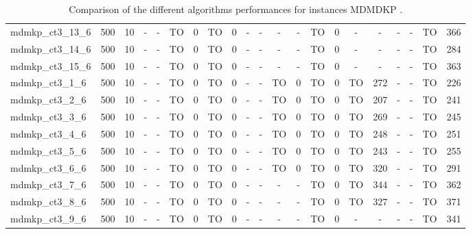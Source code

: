 \begin{sidewaystable}[!ht]
{\begin{tabular}{lcccccccccccccccccccc}
mdmkp\_ct3\_13\_6 & 500 & 10 &  - &  - & TO & 0 & TO & 0 &  - &  - &  - &  - & TO & 0 &  - &  - &  - &  - & TO & 366 \\
mdmkp\_ct3\_14\_6 & 500 & 10 &  - &  - & TO & 0 & TO & 0 &  - &  - &  - &  - & TO & 0 &  - &  - &  - &  - & TO & 284 \\
mdmkp\_ct3\_15\_6 & 500 & 10 &  - &  - & TO & 0 & TO & 0 &  - &  - &  - &  - & TO & 0 &  - &  - &  - &  - & TO & 363 \\
mdmkp\_ct3\_1\_6 & 500 & 10 &  - &  - & TO & 0 & TO & 0 &  - &  - & TO & 0 & TO & 0 & TO & 272 &  - &  - & TO & 226 \\
mdmkp\_ct3\_2\_6 & 500 & 10 &  - &  - & TO & 0 & TO & 0 &  - &  - & TO & 0 & TO & 0 & TO & 207 &  - &  - & TO & 241 \\
mdmkp\_ct3\_3\_6 & 500 & 10 &  - &  - & TO & 0 & TO & 0 &  - &  - & TO & 0 & TO & 0 & TO & 269 &  - &  - & TO & 245 \\
mdmkp\_ct3\_4\_6 & 500 & 10 &  - &  - & TO & 0 & TO & 0 &  - &  - & TO & 0 & TO & 0 & TO & 248 &  - &  - & TO & 251 \\
mdmkp\_ct3\_5\_6 & 500 & 10 &  - &  - & TO & 0 & TO & 0 &  - &  - & TO & 0 & TO & 0 & TO & 243 &  - &  - & TO & 255 \\
mdmkp\_ct3\_6\_6 & 500 & 10 &  - &  - & TO & 0 & TO & 0 &  - &  - & TO & 0 & TO & 0 & TO & 320 &  - &  - & TO & 291 \\
mdmkp\_ct3\_7\_6 & 500 & 10 &  - &  - & TO & 0 & TO & 0 &  - &  - &  - &  - & TO & 0 & TO & 344 &  - &  - & TO & 362 \\
mdmkp\_ct3\_8\_6 & 500 & 10 &  - &  - & TO & 0 & TO & 0 &  - &  - &  - &  - & TO & 0 & TO & 327 &  - &  - & TO & 371 \\
mdmkp\_ct3\_9\_6 & 500 & 10 &  - &  - & TO & 0 & TO & 0 &  - &  - &  - &  - & TO & 0 &  - &  - &  - &  - & TO & 341 \\
\bottomrule
\end{tabular}
}%
\caption{Comparison of the different algorithms performances for instances MDMDKP .}
\label{tab:table_compare_MDMDKP }
\end{sidewaystable}

